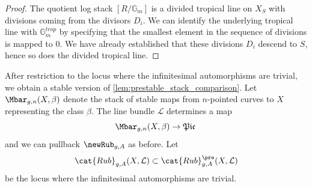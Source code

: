 \documentclass[a4paper,12pt]{article} %
\newcommand{\bb}[1]{{\mathbb{#1}}}
\newcommand{\ca}[1]{{\mathcal{#1}}}
\theoremstyle{definition}
\theoremstyle{plain}%
\newcommand{\MbarX}{\Mbar_{g,n}(X, \beta)}
\newcommand{\Picabs}{\mathfrak{Pic}}
\begin{document}
\begin{proof}

The quotient log stack $[R/\bb G_m]$ is a divided tropical line on $X_S$ with divisions coming from the divisors $D_i$. We can identify the underlying tropical line with $\bb G_m^{trop}$ by specifying that the smallest element in the sequence of divisions is mapped to $0$. We have already established that these divisions $D_i$ descend to $S$, hence so does the divided tropical line. 
\end{proof}





After restriction to the locus 
where the infinitesimal automorphisms are trivial, we obtain
 a stable version of \cref{lem:prestable_stack_comparison}. 
Let $\MbarX$ denote the stack of stable maps from $n$-pointed curves to $X$ 
representing  the class $\beta$.
The line bundle $\ca L$ determines 
a map $$\MbarX \to \Picabs\, $$  
and we can pullback $\newRub_{g,A}$ as before.
Let $$\cat{Rub}_{g,A}(X, \ca L) \subset \cat{Rub}_{g,A}^{\pre}(X, \ca L)$$ 
be the locus where the infinitesimal automorphisms are trivial.
\end{document}
